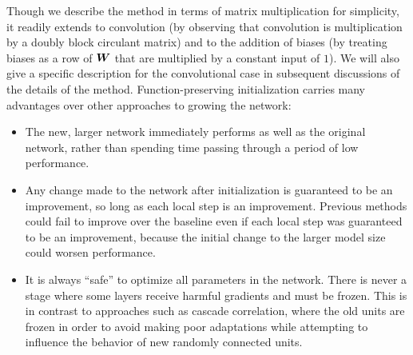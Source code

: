 \documentclass{article} %
\begin{document}
Though we describe the method in terms of matrix multiplication for
simplicity, it readily extends to convolution (by observing that
convolution is multiplication by a doubly block circulant matrix)
and to the addition of biases (by treating biases as a row of
${\bm{W}}$ that are multiplied by a constant input of $1$).
We will also give a specific description for the convolutional
case in subsequent discussions of the details of the method.
Function-preserving initialization carries many advantages over
other approaches to growing the network:
\begin{itemize}
\item The new, larger network immediately performs as well as the
original network, rather than spending time passing through
a period of low performance.
\item Any change made to the network after initialization is guaranteed
to be an improvement, so long as each local step is an improvement.
Previous methods could fail to improve over the baseline even if
each local step was guaranteed to be an improvement, because the
initial change to the larger model size could worsen performance.
\item It is always ``safe'' to optimize all parameters in the network.
There is never a stage where some layers receive harmful gradients
and must be frozen. This is in contrast to approaches such as cascade
correlation, where the old units are frozen in order to avoid making
poor adaptations while attempting to influence the behavior of new
randomly connected units.
\end{itemize}
\end{document}
